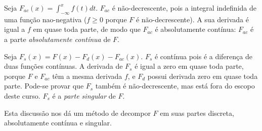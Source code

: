 \begin{frame}

\begin{block}{}


Seja $F_{ac}(x)=\int_{-\infty}^{x}f(t)dt$. $F_{ac}$ é não-decrescente, pois a integral indefinida de uma função nao-negativa ($f\geq 0$ porque $F$ é não-decrescente). A sua derivada é igual a $f$ em quase toda parte, de modo que $F_{ac}$ é absolutamente contínua: $F_{ac}$ é a parte {\em absolutamente contínua} de $F$.

Seja $F_s(x)=F(x)-F_d(x)-F_{ac}(x)$. $F_s$ é contínua pois é a diferença de duas funções contínuas. A derivada de $F_s$ é igual a zero em quase toda parte, porque $F$ e $F_{ac}$ têm a mesma derivada $f$, e $F_d$ possui derivada zero em quase toda parte. Pode-se provar que $F_s$ também é não-decrescente, mas está fora do escopo deste curso. $F_s$ é a {\em parte singular} de $F$.

Esta discussão nos dá um método de decompor $F$ em suas partes discreta, absolutamente contínua e singular.

\end{block}
\end{frame}
%
